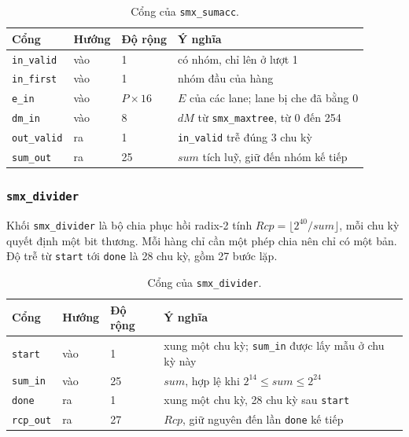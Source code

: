 \begin{table}[htbp]
\centering
\small
\begin{tabular}{p{2.7cm}p{1.2cm}p{1.9cm}p{7.2cm}}
\toprule
Cổng & Hướng & Độ rộng & Ý nghĩa \\
\midrule
\texttt{in\_valid} & vào & 1 & có nhóm, chỉ lên ở lượt 1 \\
\texttt{in\_first} & vào & 1 & nhóm đầu của hàng \\
\texttt{e\_in} & vào & $P \times 16$ & $E$ của các lane; lane bị che đã bằng 0 \\
\texttt{dm\_in} & vào & 8 & $dM$ từ \texttt{smx\_maxtree}, từ 0 đến 254 \\
\texttt{out\_valid} & ra & 1 & \texttt{in\_valid} trễ đúng 3 chu kỳ \\
\texttt{sum\_out} & ra & 25 & $\mathit{sum}$ tích luỹ, giữ đến nhóm kế tiếp \\
\bottomrule
\end{tabular}
\caption{Cổng của \texttt{smx\_sumacc}.}
\label{tab:p-sumacc}
\end{table}


\subsubsection{\texttt{smx\_divider}}

Khối \texttt{smx\_divider} là bộ chia phục hồi radix-2 tính $\mathit{Rcp} = \lfloor 2^{40} / \mathit{sum} \rfloor$, mỗi chu kỳ quyết định một bit thương. Mỗi hàng chỉ cần một phép chia nên chỉ có một bản. Độ trễ từ \texttt{start} tới \texttt{done} là 28 chu kỳ, gồm 27 bước lặp.

\begin{table}[htbp]
\centering
\small
\begin{tabular}{p{2.7cm}p{1.2cm}p{1.9cm}p{7.2cm}}
\toprule
Cổng & Hướng & Độ rộng & Ý nghĩa \\
\midrule
\texttt{start} & vào & 1 & xung một chu kỳ; \texttt{sum\_in} được lấy mẫu ở chu kỳ này \\
\texttt{sum\_in} & vào & 25 & $\mathit{sum}$, hợp lệ khi $2^{14} \le \mathit{sum} \le 2^{24}$ \\
\texttt{done} & ra & 1 & xung một chu kỳ, 28 chu kỳ sau \texttt{start} \\
\texttt{rcp\_out} & ra & 27 & $\mathit{Rcp}$, giữ nguyên đến lần \texttt{done} kế tiếp \\
\bottomrule
\end{tabular}
\caption{Cổng của \texttt{smx\_divider}.}
\label{tab:p-divider}
\end{table}


